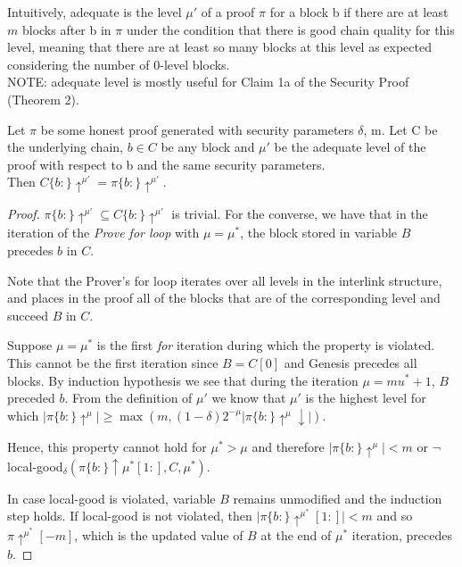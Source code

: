 Intuitively, adequate is the level $\mu'$ of a proof $\pi$ for a block b
if there are at least $m$ blocks after b in $\pi$ under the condition that there
is good chain quality for this level, meaning that there are at least so many blocks
at this level as expected considering the number of 0-level blocks.\\
NOTE: adequate level is mostly useful for Claim 1a of the Security Proof (Theorem 2).\\

\begin{lemma}
	Let $\pi$ be some honest proof generated with security
	parameters $\delta$, m. Let C be the underlying chain, $b \in C$ be any block
	and $\mu'$ be the adequate level of the proof with respect to b and the same
	security parameters.\\Then $C\{b:\}\uparrow^{\mu'} = \pi\{b:\}\uparrow^{\mu'}$.
	\label{lemm:complete_adequate}
\end{lemma}
\begin{proof}
	$ \pi\{b:\}\uparrow^{\mu'} \subseteq C\{b:\}\uparrow^{\mu'}$ is
	trivial. For the converse, we have that in the iteration of the \emph{Prove for
	loop}\cite{nipopows} with $\mu = \mu^*$, the block stored in variable $B$
	precedes $b$ in $C$.

	Note that the Prover's for loop iterates over all levels in the interlink structure,
	and places in the proof all of the blocks that are of the corresponding level and succeed $B$ in $C$.

	Suppose $\mu = \mu^*$ is the first \emph{for} iteration during which the property
	is violated. This cannot be the first iteration since $B = C[0]$ and Genesis
	precedes all blocks. By induction hypothesis we see that during the iteration
	$\mu = mu^* + 1$, $B$ preceded $b$. From the definition of $\mu'$ we know that
	$\mu'$ is the highest level for which $\vert \pi\{b:\}\uparrow^{\mu} \vert
	\geq \max( m, (1-\delta)2^{-\mu} \vert \pi\{b:\}\uparrow^{\mu}\downarrow \vert ) $.

	Hence, this property cannot hold for $\mu^* > \mu$ and therefore $\vert
	\pi\{b:\}\uparrow^{\mu} \vert < m$ or $\neg$local-good$_\delta(\pi\{b:
	\}\uparrow \mu^*[1:], C, \mu^*)$.

	In case local-good is violated, variable $B$ remains unmodified and the induction
	step holds. If local-good is not violated, then $ \vert \pi\{b:\} \uparrow^{\mu^*}[1:]
	\vert < m$ and so $\pi\uparrow^{\mu^*}[-m]$, which is the updated value of $B$ at the
	end of $\mu^*$ iteration, precedes $b$.
\end{proof}

